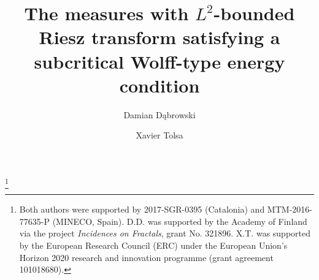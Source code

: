 \documentclass[11pt]{amsart}
\theoremstyle{definition}
\theoremstyle{remark}
\numberwithin{equation}{section}
\begin{document}

\title[The measures with $L^2$-bounded Riesz transform]{The measures with $L^2$-bounded Riesz transform satisfying a subcritical Wolff-type energy condition}



\author[D. D\k{a}browski]{Damian D\k{a}browski}
\address{Damian D\k{a}browski\\ Departament de Matem\`atiques, Universitat Aut\`onoma de Barcelona, and Barcelona Graduate School of Mathematics (BGSMath)\newline\indent Edifici C Facultat de Ci\`encies, 08193 Bellaterra, Barcelona, Catalonia, Spain\newline\indent
Current address: P.O. Box 35 (MaD), 40014 University of Jyväskylä, Finland}


\author[X. Tolsa]{Xavier Tolsa}
\address{Xavier Tolsa
\\
ICREA, Passeig Llu\'{\i}s Companys 23 08010 Barcelona, Catalonia\\
 Departament de Matem\`atiques, and BGSMath
\\
Universitat Aut\`onoma de Barcelona
\\
08193 Bellaterra (Barcelona), Catalonia.
}


\thanks{Both authors were supported by 2017-SGR-0395 (Catalonia) and MTM-2016-77635-P (MINECO, Spain). D.D. was supported by the Academy of Finland via the project \textit{Incidences on Fractals}, grant No. 321896. X.T. was supported by
 the European Research Council (ERC) under the European Union's Horizon 2020 research and innovation programme (grant agreement 101018680).}


\end{document}
